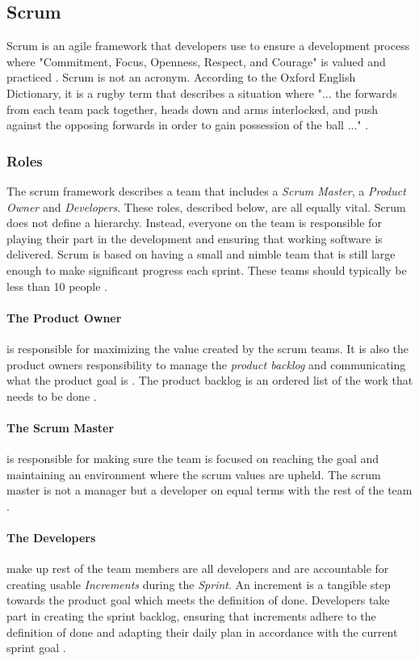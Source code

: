 \subsection{Scrum}\label{sub:scrum}
Scrum is an agile framework that developers use to ensure a development process where "Commitment, Focus, Openness, Respect, and Courage" is valued and practiced \cite{schwaber_sutherland_2022}. Scrum is not an acronym. According to the Oxford English Dictionary, it is a rugby term that describes a situation where "... the forwards from each team pack together, heads down and arms interlocked, and push against the opposing forwards in order to gain possession of the ball ..." \cite{oedscrum}.


\subsubsection{Roles}
The scrum framework describes a team that includes a \emph{Scrum Master}, a \emph{Product Owner} and \emph{Developers}. These roles, described below, are all equally vital. Scrum does not define a hierarchy. Instead, everyone on the team is responsible for playing their part in the development and ensuring that working software is delivered. Scrum is based on having a small and nimble team that is still large enough to make significant progress each sprint. These teams should typically be less than 10 people \cite{schwaber_sutherland_2022}.

\paragraph{The Product Owner}
is responsible for maximizing the value created by the scrum teams. It is also the product owners responsibility to manage the \emph{product backlog} and communicating what the product goal is \cite{schwaber_sutherland_2022}. The product backlog is an ordered list of the work that needs to be done \cite{schwaber_sutherland_2022}.

\paragraph{The Scrum Master}
is responsible for making sure the team is focused on reaching the goal and maintaining an environment where the scrum values are upheld. The scrum master is not a manager but a developer on equal terms with the rest of the team \cite{schwaber_sutherland_2022}.

\paragraph{The Developers}
make up rest of the team members are all developers and are accountable for creating usable \emph{Increments} during the \emph{Sprint}. An increment is a tangible step towards the product goal which meets the definition of done. 
Developers take part in creating the sprint backlog, ensuring that increments adhere to the definition of done and adapting their daily plan in accordance with the current sprint goal \cite{schwaber_sutherland_2022}.

